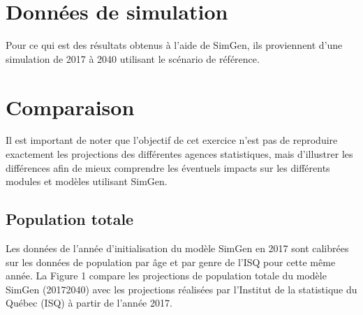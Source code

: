 \documentclass[letterpaper,10pt,french]{sphinxmanual}
\begin{document}
\section{Données de simulation}
\label{\detokenize{resultats:donnees-de-simulation}}
Pour ce qui est des résultats obtenus à l’aide de SimGen, ils proviennent d’une simulation de 2017 à 2040 utilisant le scénario de référence.

\begin{sphinxVerbatim}[commandchars=\\\{\}]
  
\end{sphinxVerbatim}


\section{Comparaison}
\label{\detokenize{resultats:comparaison}}
Il est important de noter que l’objectif de cet exercice n’est pas de reproduire exactement les projections des différentes agences statistiques, mais d’illustrer les différences afin de mieux comprendre les éventuels impacts sur les différents modules et modèles utilisant SimGen.


\subsection{Population totale}
\label{\detokenize{resultats:population-totale}}
\begin{figure}[htbp]
\centering

\noindent{}
\end{figure}

Les données de l’année d’initialisation du modèle SimGen en 2017 sont calibrées sur les données de population par âge et par genre de l’ISQ pour cette même année. La Figure 1 compare les projections de population totale du modèle SimGen (2017\sphinxhyphen{}2040) avec les projections réalisées par l’Institut de la statistique du Québec (ISQ) à partir de l’année 2017.
\end{document}
